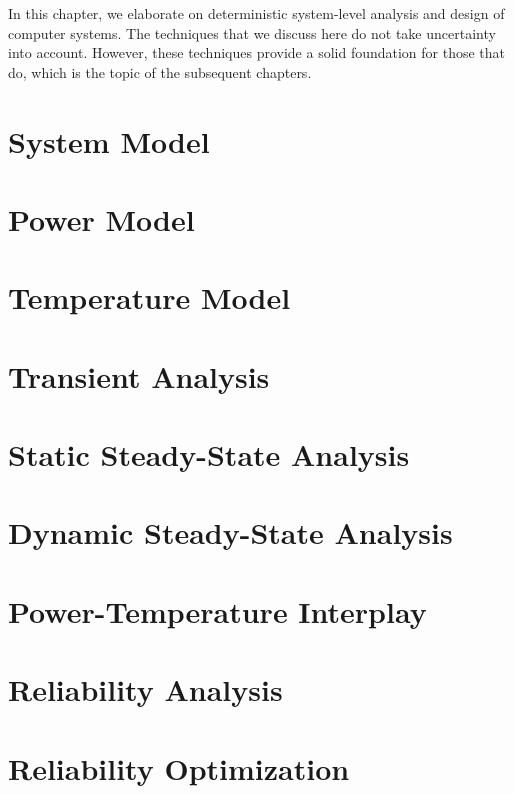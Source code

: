 In this chapter, we elaborate on deterministic system-level analysis and design
of computer systems. The techniques that we discuss here do not take uncertainty
into account. However, these techniques provide a solid foundation for those
that do, which is the topic of the subsequent chapters.

\section{\introductiontitle}

\section{System Model}

\section{Power Model}

\section{Temperature Model}

\section{Transient Analysis}

\section{Static Steady-State Analysis}

\section{Dynamic Steady-State Analysis}

\section{Power-Temperature Interplay}

\section{Reliability Analysis}

\section{Reliability Optimization}

\section{\conclusiontitle}
